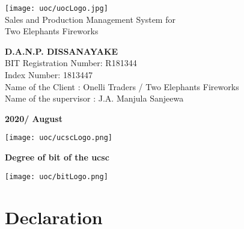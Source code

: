 \documentclass[12pt]{report}
\begin{document}
\onehalfspacing

\setlength{\parindent}{3em} %
\setlength{\parskip}{1em} %

\thispagestyle{empty}
\begin{titlepage}
	\begin{center}
		\vspace*{2cm}
		\texttt{[image: uoc/uocLogo.jpg]}\\
		\vspace{1cm}
		{\LARGE Sales and Production Management System for \\Two Elephants Fireworks}
		\vspace{2cm}
		\begin{large}

			\textbf{D.A.N.P. DISSANAYAKE}\\
			\vspace{2cm}
			BIT Registration Number: R181344 \\
			Index Number: 1813447 \\
			Name of the Client :  Onelli Traders / Two Elephants Fireworks \\
			Name of the supervisor :  J.A. Manjula Sanjeewa \\

			\vspace{1cm}

			\bf{2020/ August}

			\vspace{2.5cm}

			\vfill


			\texttt{[image: uoc/ucscLogo.png]}%
			\begin{minipage}[b]{0.7\textwidth}
				\centering
				{\small \bf Degree of \acrlong{bit} of the \acrlong{ucsc}}
			\end{minipage}%
			\texttt{[image: uoc/bitLogo.png]}
		\end{large}
	\end{center}
\end{titlepage}

\newpage
\thispagestyle{plain}
\setcounter{page}{2}
\chapter*{\Huge Declaration}
\end{document}
